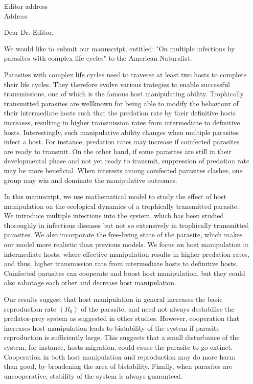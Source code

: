 \documentclass[10,DIN, pagenumber=false, parskip=half,fromalign=right, fromphone=false,fromemail=false, fromurl=false,fromlogo=true, fromrule=false]{scrlttr2}
\begin{document}
\sffamily

\begin{letter}{
\sffamily
\vspace{-0.4cm}
Editor address\\
Address
}
\opening{\sffamily \vspace{-1cm} Dear Dr. Editor,}
\vspace{-0.3cm}

We would like to submit our manuscript, entitled: "On multiple infections by parasites with complex life cycles"
to the American Naturalist.

Parasites with complex life cycles need to traverse at least two hosts to complete their life cycles.
They therefore evolve various trategies to enable successful transmissions, 
one of which is the famous host manipulating ability.
Trophically transmitted parasites are wellknown for being able to modify the behaviour of their
intermediate hosts such that the predation rate by their definitive hosts increases, 
resulting in higher transmission rates from intermediate to definitive hosts.
Interestingly, such manipulative ability changes when multiple parasites infect a host. 
For instance, predation rates may increase if coinfected parasites are ready to transmit. 
On the other hand, if some parasites are still in their developmental phase and not yet
ready to transmit, suppression of predation rate may be more beneficial.
When interests among coinfected parasites clashes, one group may win and dominate the manipulative outcomes.

In this manuscript, we use mathematical model to study the effect of host manipulation 
on the ecological dynamics of a trophically transmitted parasite.
We introduce multiple infections into the system, which has been studied thoroughly in
infectious diseases but not so extensively in trophically transmitted parasites.
We also incorporate the free-living state of the parasite, which makes our model more realistic than previous models.
We focus on host manipulation in intermediate hosts, where effective manipulation results in higher predation rates, 
and thus, higher transmission rate from intermediate hosts to definitive hosts.
Coinfected parasites can cooperate and boost host manipulation,
but they could also sabotage each other and decrease host manipulation.

Our results suggest that host manipulation in general increases the basic reproduction rate $(R_0)$ of the parasite,
and need not always destabilise the predator-prey system as suggested in other studies.
However, cooperation that increases host manipulation leads to bistability of the system if parasite reproduction is sufficiently large.
This suggests that a small disturbance of the system, for instance, hosts migration, could cause the parasite to go extinct.
Cooperation in both host manipulation and reproduction may do more harm than good, by broadening the area of bistability.
Finally, when parasites are uncooperative, stability of the system is always guaranteed.


\end{letter}
\end{document}
